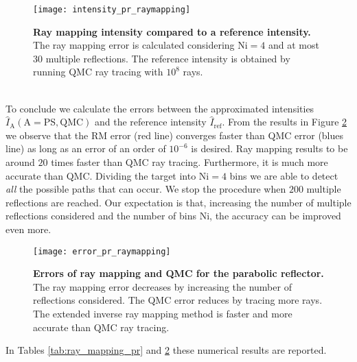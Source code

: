 \begin{figure}[t]
  \begin{center}
  \texttt{[image: intensity\_pr\_raymapping]}
  \end{center}
  \caption{\textbf{Ray mapping intensity compared to a reference intensity.}
The ray mapping error is calculated considering $\textrm{Ni}=4$ and at most $30$ multiple reflections. The reference intensity is obtained by running QMC ray tracing with $10^8$ rays.}
\label{fig:intensity_pr_raymapping}
 \end{figure}
\\ \indent
To conclude we calculate the errors between the approximated intensities $\hat{I}_{\textrm{A}} (\textrm{A}=\textrm{PS}, \textrm{QMC})$ and the reference intensity $\hat{I}_{\textrm{ref}}$. From the results in Figure \ref{tab:qmc_raymapping_pr} we observe that the RM error (red line) converges faster than QMC error (blues line) as long as an error of an order of $10^{-6}$ is desired. Ray mapping results to be around $20$ times faster than QMC ray tracing. Furthermore, it is much more accurate than QMC. Dividing the target into $\textrm{Ni}=4$ bins we are able to detect \textit{all} the possible paths that can occur. We stop the procedure when $200$ multiple reflections are reached. Our expectation is that, increasing the number of multiple reflections considered and the number of bins $\textrm{Ni}$, the accuracy can be improved even more.
\begin{figure}[t]
  \begin{center}
  \texttt{[image: error\_pr\_raymapping]}
  \end{center}
  \caption{\textbf{Errors of ray mapping and QMC for the parabolic reflector.}
The ray mapping error decreases by increasing the number of reflections considered.
The QMC error reduces by tracing more rays.
 The extended inverse ray mapping method is faster and more accurate than QMC ray tracing.}
\label{tab:qmc_raymapping_pr}
 \end{figure}
In Tables \ref{tab:ray_mapping_pr} and \ref{tab:qmc_raymapping_pr} these numerical results are reported.
